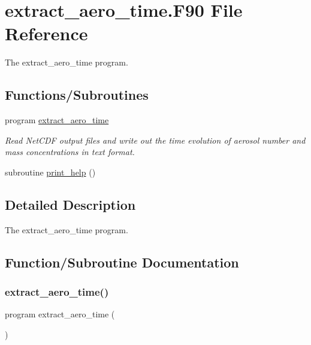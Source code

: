 \hypertarget{extract__aero__time_8_f90}{}\section{extract\+\_\+aero\+\_\+time.\+F90 File Reference}
\label{extract__aero__time_8_f90}


The extract\+\_\+aero\+\_\+time program.  


\subsection*{Functions/\+Subroutines}
\begin{DoxyCompactItemize}
\item 
program \mbox{\hyperlink{extract__aero__time_8_f90_aae3563eedf2dbb217ad42096efd2b193}{extract\+\_\+aero\+\_\+time}}
\begin{DoxyCompactList}\small\item\em Read Net\+C\+DF output files and write out the time evolution of aerosol number and mass concentrations in text format. \end{DoxyCompactList}\item 
subroutine \mbox{\hyperlink{extract__aero__time_8_f90_a591247c9ca9dc6ed7df9d6453cfbe8a2}{print\+\_\+help}} ()
\end{DoxyCompactItemize}


\subsection{Detailed Description}
The extract\+\_\+aero\+\_\+time program. 



\subsection{Function/\+Subroutine Documentation}
\mbox{\label{extract__aero__time_8_f90_aae3563eedf2dbb217ad42096efd2b193}} 
\subsubsection{\texorpdfstring{extract\+\_\+aero\+\_\+time()}{extract\_aero\_time()}}
{\footnotesize\ttfamily program extract\+\_\+aero\+\_\+time (\begin{DoxyParamCaption}{ }\end{DoxyParamCaption})}



